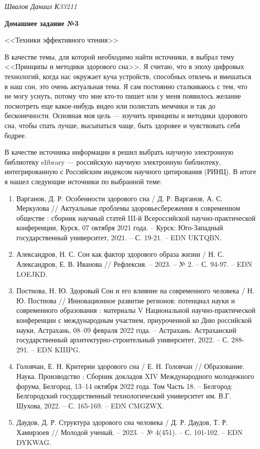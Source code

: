 \documentclass[a4paper, 14pt]{extarticle}
\begin{document}
\begin{flushright}
  \textit{Швалов Даниил К33211}
\end{flushright}

\begin{center}
  \bfseries
  Домашнее задание №3

  <<Техники эффективного чтения>>
\end{center}

В качестве темы, для которой необходимо найти источники, я выбрал тему
<<Принципы и методики здорового сна>>. Я считаю, что в эпоху цифровых
технологий, когда нас окружает куча устройств, способных отвлечь и вмешаться в
наш сон, это очень актуальная тема. Я сам постоянно сталкиваюсь с тем, что
не могу уснуть, потому что мне кто-то пишет или у меня появилось желание
посмотреть еще какое-нибудь видео или полистать мемчики и так до бесконечности.
Основная моя цель --- изучить принципы и методики здорового сна, чтобы спать
лучше, высыпаться чаще, быть здоровее и чувствовать себя бодрее.

В качестве источника информации я решил выбрать научную электронную библиотеку
elibrary --- российскую научную электронную библиотеку, интегрированную с
Российским индексом научного цитирования (РИНЦ). В итоге я нашел следующие источники по выбранной теме:
\begin{enumerate}
  \item Варганов, Д. Р. Особенности здорового сна / Д. Р. Варганов, А. С.
  Меркулова // Актуальные проблемы здоровьесбережения в современном обществе :
  сборник научный статей III-й Всероссийской научно-практической конференции,
  Курск, 07 октября 2021 года. – Курск: Юго-Западный государственный университет,
  2021. – С. 19-21. – EDN UKTQBN.

  \item Александров, Н. С. Сон как фактор здорового образа жизни / Н. С.
  Александров, Е. В. Иванова // Рефлексия. – 2023. – № 2. – С. 94-97. – EDN
  LOEJKD.

  \item Постнова, Н. Ю. Здоровый Сон и его влияние на современного человека / Н.
  Ю. Постнова // Инновационное развитие регионов: потенциал науки и современного
  образования : материалы V Национальной научно-практической конференции с
  международным участием, приуроченной ко Дню российской науки, Астрахань, 08–09
  февраля 2022 года. – Астрахань: Астраханский государственный
  архитектурно-строительный университет, 2022. – С. 288-291. – EDN KIIIPG.

  \item Головчан, Е. Н. Критерии здорового сна / Е. Н. Головчан // Образование.
  Наука. Производство : Сборник докладов XIV Международного молодежного форума,
  Белгород, 13–14 октября 2022 года. Том Часть 18. – Белгород: Белгородский
  государственный технологический университет им. В.Г. Шухова, 2022. – С. 165-169.
  – EDN CMGZWX.

  \item Даудов, Д. Р. Структура здорового сна человека / Д. Р. Даудов, Т. Р.
  Хамирзоев // Молодой ученый. – 2023. – № 4(451). – С. 101-102. – EDN DYKWAG.
\end{enumerate}
\end{document}
